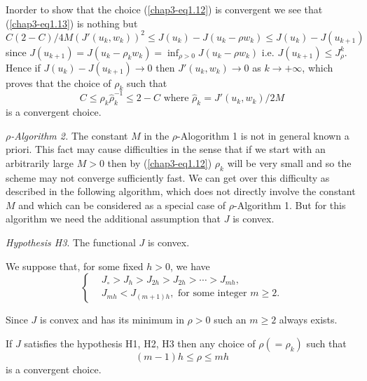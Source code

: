 In\pageoriginale order to show that the choice (\ref{chap3-eq1.12}) is convergent we see that (\ref{chap3-eq1.13}) is nothing but
$$
C(2-C)/4M (J'(u_{k}, w_{k}))^{2} \leq J(u_{k}) - J(u_{k} - \rho w_{k}) \leq J(u_{k}) - J(u_{k+1})
$$
since $J(u_{k+1}) = J(u_{k} - \rho_{k} w_{k}) = \inf_{\rho > 0} J(u_{k} - \rho w_{k})$ i.e. $J(u_{k+1}) \leq J_{\rho}^{k}$. Hence if $J(u_{k}) - J(u_{k+1}) \to 0$ then $J'(u_{k}, w_{k}) \to 0$ as $k \to + \infty$, which proves that the choice of $\rho_{k}$ such that
$$
C \leq \rho_{k} \hat{\rho}_{k}^{-1} \leq 2-C \text{ where } \hat{\rho}_{k} = J'(u_{k}, w_{k})/2M
$$
is a convergent choice.

{\em $\rho$-Algorithm 2.} The constant $M$ in the $\rho$-Alogorithm 1 is not in general known a priori. This fact may cause difficulties in the sense that if we start with an arbitrarily large $M > 0$ then by (\ref{chap3-eq1.12}) $\rho_{k}$ will be very small and so the scheme may not converge sufficiently fast. We can get over this difficulty as described in the following algorithm, which does not directly involve the constant $M$ and which can be considered as a special case of $\rho$-Algorithm 1. But for this algorithm we need the additional assumption that $J$ is convex.

{\em Hypothesis H3}. The functional $J$ is convex.

We suppose that, for some fixed $h > 0$, we have
\begin{equation*}
\begin{cases}
& J_{\circ} > J_{h} > J_{2h} > J_{2h} > \cdots > J_{mh},\\
& J_{mh} < J_{(m+1)h}, \text{ for some integer } m \geq 2.\tag{1.14}\label{chap3-eq1.14}
\end{cases}
\end{equation*}

Since $J$ is convex and has its minimum in $\rho > 0$ such an $m \geq 2$ always exists.

\begin{proposition}\label{chap3-prop1.5}
If $J$ satisfies the hypothesis H1, H2, H3 then any choice of $\rho(= \rho_{k})$ such that
\begin{equation*}
(m-1)h \leq \rho \leq mh\tag{1.15}\label{chap3-eq1.15}
\end{equation*}\pageoriginale
is a convergent choice.
\end{proposition}

